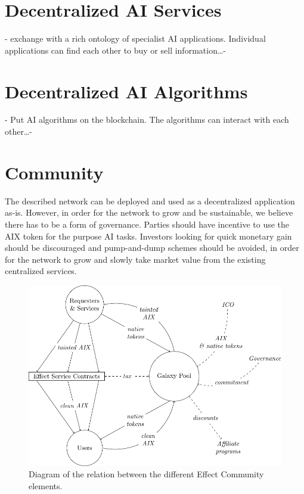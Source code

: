 \documentclass{article}
\begin{document}
\section{Decentralized AI Services}
\label{sec:phase2}
- exchange with a rich ontology of specialist AI applications. Individual applications can find each other to buy or sell information\dots -

\section{Decentralized AI Algorithms}
\label{sec:phase3}
- Put AI algorithms on the blockchain. The algorithms can interact with each other\dots -

\section{Community}
The described network can be deployed and used as a decentralized
application as-is. However, in order for the network to grow and be
sustainable, we believe there has to be a form of governance. Parties
should have incentive to use the AIX token for the purpose AI
tasks. Investors looking for quick monetary gain should be discouraged
and pump-and-dump schemes should be avoided, in order for the network
to grow and slowly take market value from the existing centralized
services.

\begin{figure}[htb]
\includegraphics[width=\textwidth]{pictures/galaxy.pdf}
\caption{Diagram of the relation between the different Effect
  Community elements.}
\end{figure}
\end{document}
